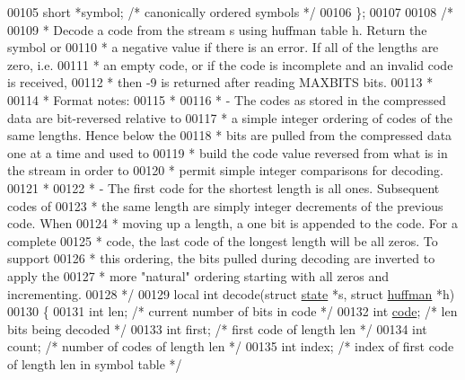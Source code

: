 \begin{DoxyCode}
00105     \textcolor{keywordtype}{short} *symbol;      \textcolor{comment}{/* canonically ordered symbols */}
00106 \};
00107 
00108 \textcolor{comment}{/*}
00109 \textcolor{comment}{ * Decode a code from the stream s using huffman table h.  Return the symbol or}
00110 \textcolor{comment}{ * a negative value if there is an error.  If all of the lengths are zero, i.e.}
00111 \textcolor{comment}{ * an empty code, or if the code is incomplete and an invalid code is received,}
00112 \textcolor{comment}{ * then -9 is returned after reading MAXBITS bits.}
00113 \textcolor{comment}{ *}
00114 \textcolor{comment}{ * Format notes:}
00115 \textcolor{comment}{ *}
00116 \textcolor{comment}{ * - The codes as stored in the compressed data are bit-reversed relative to}
00117 \textcolor{comment}{ *   a simple integer ordering of codes of the same lengths.  Hence below the}
00118 \textcolor{comment}{ *   bits are pulled from the compressed data one at a time and used to}
00119 \textcolor{comment}{ *   build the code value reversed from what is in the stream in order to}
00120 \textcolor{comment}{ *   permit simple integer comparisons for decoding.}
00121 \textcolor{comment}{ *}
00122 \textcolor{comment}{ * - The first code for the shortest length is all ones.  Subsequent codes of}
00123 \textcolor{comment}{ *   the same length are simply integer decrements of the previous code.  When}
00124 \textcolor{comment}{ *   moving up a length, a one bit is appended to the code.  For a complete}
00125 \textcolor{comment}{ *   code, the last code of the longest length will be all zeros.  To support}
00126 \textcolor{comment}{ *   this ordering, the bits pulled during decoding are inverted to apply the}
00127 \textcolor{comment}{ *   more "natural" ordering starting with all zeros and incrementing.}
00128 \textcolor{comment}{ */}
00129 local \textcolor{keywordtype}{int} decode(\textcolor{keyword}{struct} \hyperlink{structstate}{state} *s, \textcolor{keyword}{struct} \hyperlink{structhuffman}{huffman} *h)
00130 \{
00131     \textcolor{keywordtype}{int} len;            \textcolor{comment}{/* current number of bits in code */}
00132     \textcolor{keywordtype}{int} \hyperlink{structcode}{code};           \textcolor{comment}{/* len bits being decoded */}
00133     \textcolor{keywordtype}{int} first;          \textcolor{comment}{/* first code of length len */}
00134     \textcolor{keywordtype}{int} count;          \textcolor{comment}{/* number of codes of length len */}
00135     \textcolor{keywordtype}{int} index;          \textcolor{comment}{/* index of first code of length len in symbol table */}

\end{DoxyCode}
